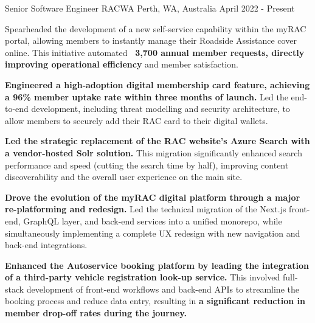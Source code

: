 

\begin{cventries}

  \cventry
    {Senior Software Engineer} %
    {RACWA} %
    {Perth, WA, Australia} %
    {April 2022 - Present} %
    {
      \begin{cvitems} %
        \item {Spearheaded the development of a new self-service capability within the myRAC portal, allowing members to instantly manage their Roadside Assistance cover online. This initiative automated \textbf{~3,700 annual member requests, directly improving operational efficiency} and member satisfaction.}
        \item {\textbf{Engineered a high-adoption digital membership card feature, achieving a 96\% member uptake rate within three months of launch.} Led the end-to-end development, including threat modelling and security architecture, to allow members to securely add their RAC card to their digital wallets.}
        \item {\textbf{Led the strategic replacement of the RAC website's Azure Search with a vendor-hosted Solr solution.} This migration significantly enhanced search performance and speed (cutting the search time by half), improving content discoverability and the overall user experience on the main site.}
        \item {\textbf{Drove the evolution of the myRAC digital platform through a major re-platforming and redesign.} Led the technical migration of the Next.js front-end, GraphQL layer, and back-end services into a unified monorepo, while simultaneously implementing a complete UX redesign with new navigation and back-end integrations.}
        \item {\textbf{Enhanced the Autoservice booking platform by leading the integration of a third-party vehicle registration look-up service.} This involved full-stack development of front-end workflows and back-end APIs to streamline the booking process and reduce data entry, resulting in \textbf{a significant reduction in member drop-off rates during the journey.}}

\end{cvitems}}
\end{cventries}
